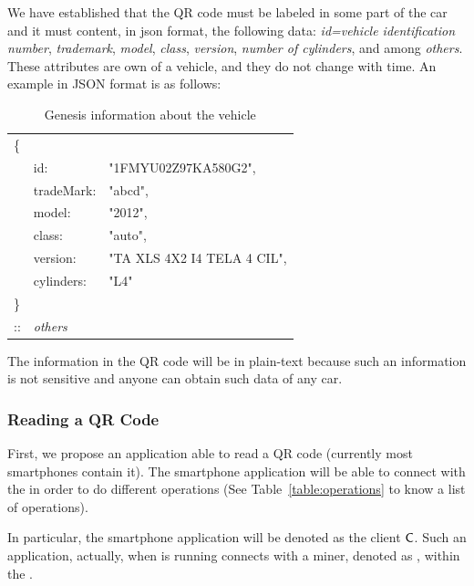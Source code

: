 We have established that the QR code must be labeled in some part of the car and it must content,  
in json format, the following data: 
\textit{id=vehicle identification number}, 
\textit{trademark}, 
\textit{model}, 
\textit{class}, 
\textit{version}, 
\textit{number of cylinders}, and
among \textit{others}. These attributes are own of a vehicle, and they do not 
change with time. An example in JSON format is as follows:
\begin{table}[h]
    \centering
    \caption{Genesis information about the vehicle}
    \begin{tabular}{lll}
       \{&         			&    							\\
         & id:        		& "1FMYU02Z97KA580G2", 			\\
         & tradeMark: 		& "abcd", 						\\
         & model:     		& "2012", 						\\
         & class:     		& "auto", 						\\
         & version:   		& "TA XLS 4X2 I4 TELA 4 CIL", 	\\
         & cylinders: 		& "L4" 							\\
       \}& 		        	& 								\\
       ::& \textit{others}	&								\\
    \end{tabular}
    \label{table:genesisInfo}
\end{table}

The information in the QR code will be in plain-text because such an information is not 
sensitive and anyone can obtain such data of any car.


\subsubsection{Reading a QR Code}
\label{sssec:readingQR}

First, we propose an application able to read a QR code (currently most smartphones contain it).
The smartphone application will be able to connect with the \blockchaincarnetwork in order to do different 
operations (See Table~\ref{table:operations} to know a list of operations). 

In particular, the smartphone application will be denoted as the client $\textsf{C}$. Such an application, 
actually, when is running connects with a miner, denoted as \Server, within the \blockchaincarnetwork.




